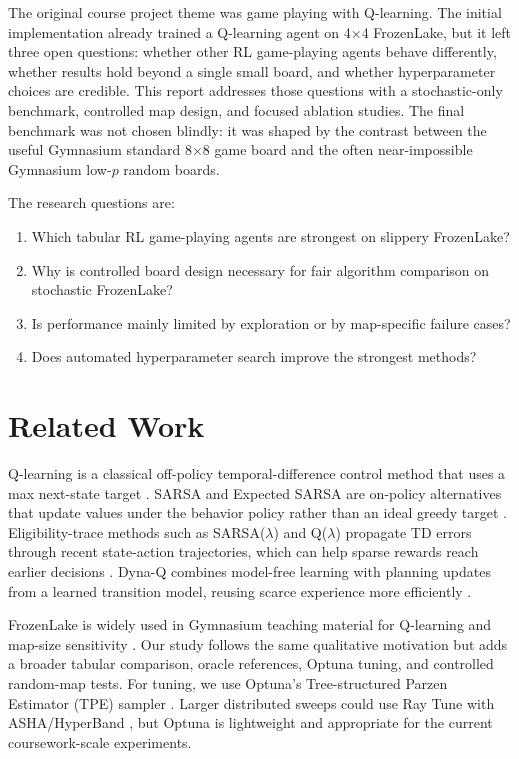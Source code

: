 \documentclass[10pt]{article}
\begin{document}
The original course project theme was game playing with Q-learning. The initial implementation already trained a Q-learning agent on 4$\times$4 FrozenLake, but it left three open questions: whether other RL game-playing agents behave differently, whether results hold beyond a single small board, and whether hyperparameter choices are credible. This report addresses those questions with a stochastic-only benchmark, controlled map design, and focused ablation studies. The final benchmark was not chosen blindly: it was shaped by the contrast between the useful Gymnasium standard 8$\times$8 game board and the often near-impossible Gymnasium low-$p$ random boards.

The research questions are:
\begin{enumerate}
    \item Which tabular RL game-playing agents are strongest on slippery FrozenLake?
    \item Why is controlled board design necessary for fair algorithm comparison on stochastic FrozenLake?
    \item Is performance mainly limited by exploration or by map-specific failure cases?
    \item Does automated hyperparameter search improve the strongest methods?
\end{enumerate}

\section{Related Work}
Q-learning is a classical off-policy temporal-difference control method that uses a max next-state target \cite{WatkinsDayan1992}. SARSA and Expected SARSA are on-policy alternatives that update values under the behavior policy rather than an ideal greedy target \cite{SuttonBarto2018}. Eligibility-trace methods such as SARSA($\lambda$) and Q($\lambda$) propagate TD errors through recent state-action trajectories, which can help sparse rewards reach earlier decisions \cite{SuttonBarto2018}. Dyna-Q combines model-free learning with planning updates from a learned transition model, reusing scarce experience more efficiently \cite{SuttonBarto2018}.

FrozenLake is widely used in Gymnasium teaching material for Q-learning and map-size sensitivity \cite{GymnasiumFrozenLakeTutorial}. Our study follows the same qualitative motivation but adds a broader tabular comparison, oracle references, Optuna tuning, and controlled random-map tests. For tuning, we use Optuna's Tree-structured Parzen Estimator (TPE) sampler \cite{OptunaTPESampler}. Larger distributed sweeps could use Ray Tune with ASHA/HyperBand \cite{RayTuneSchedulers}, but Optuna is lightweight and appropriate for the current coursework-scale experiments.
\end{document}
